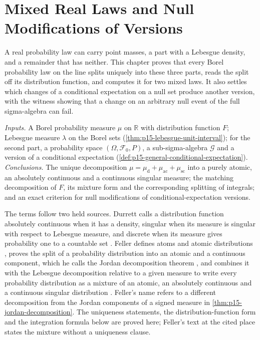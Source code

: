 \chapter{Mixed Real Laws and Null Modifications of Versions}
\label{sec:p15-w02b-p15-002-mixed-laws}

A real probability law can carry point masses, a part with a Lebesgue
density, and a remainder that has neither. This chapter proves that every
Borel probability law on the line splits uniquely into these three parts,
reads the split off its distribution function, and computes it for two
mixed laws. It also settles which changes of a conditional expectation on
a null set produce another version, with the witness showing that a
change on an arbitrary null event of the full sigma-algebra can fail.

\emph{Inputs.} A Borel probability measure \(\mu\) on \(\mathbb R\) with
distribution function \(F\); Lebesgue measure \(\lambda\) on the Borel
sets (\cref{thm:p15-lebesgue-unit-interval}); for the second part, a
probability space \((\Omega,\mathcal F_0,P)\), a sub-sigma-algebra
\(\mathcal G\) and a version of a conditional expectation
(\cref{def:p15-general-conditional-expectation}).
\emph{Conclusions.} The unique decomposition
\(\mu=\mu_{\mathrm d}+\mu_{\mathrm{ac}}+\mu_{\mathrm{sc}}\) into a purely
atomic, an absolutely continuous and a continuous singular measure; the
matching decomposition of \(F\), its mixture form and the corresponding
splitting of integrals; and an exact criterion for null modifications of
conditional-expectation versions.

The terms follow two held sources. Durrett calls a distribution function
absolutely continuous when it has a density, singular when its measure is
singular with respect to Lebesgue measure, and discrete when its measure
gives probability one to a countable set
\cite[p.~13]{DurrettPTEAuthor2019}. Feller defines atoms and atomic
distributions \cite[sec.~V.2, p.~137]{Feller1971ProbabilityII}, proves
the split of a probability distribution into an atomic and a continuous
component, which he calls the Jordan decomposition theorem
\cite[sec.~V.2, eqs.~(2.4)--(2.5), p.~138]{Feller1971ProbabilityII}, and
combines it with the Lebesgue decomposition relative to a given measure to
write every probability distribution as a mixture of an atomic, an
absolutely continuous and a continuous singular distribution
\cite[sec.~V.3, eq.~(3.9), p.~142]{Feller1971ProbabilityII}. Feller's
name refers to a different decomposition from the Jordan components of a
signed measure in \cref{thm:p15-jordan-decomposition}. The uniqueness
statements, the distribution-function form and the integration formula
below are proved here; Feller's text at the cited place states the
mixture without a uniqueness clause.


